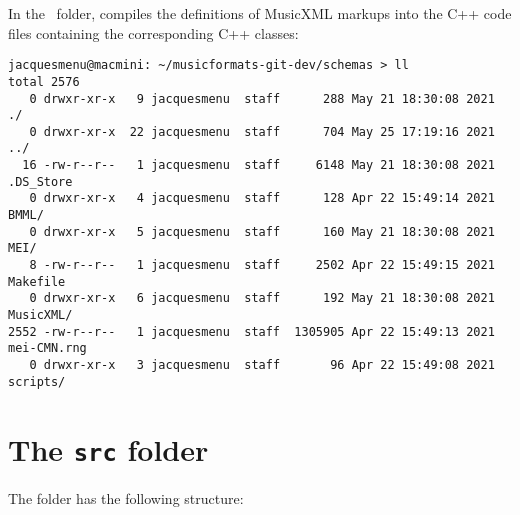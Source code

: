 In the \lxmlTemplates\ folder,  compiles the definitions of MusicXML markups into the C++ code files containing the corresponding C++ classes:
\begin{lstlisting}[language=Terminal]
jacquesmenu@macmini: ~/musicformats-git-dev/schemas > ll
total 2576
   0 drwxr-xr-x   9 jacquesmenu  staff      288 May 21 18:30:08 2021 ./
   0 drwxr-xr-x  22 jacquesmenu  staff      704 May 25 17:19:16 2021 ../
  16 -rw-r--r--   1 jacquesmenu  staff     6148 May 21 18:30:08 2021 .DS_Store
   0 drwxr-xr-x   4 jacquesmenu  staff      128 Apr 22 15:49:14 2021 BMML/
   0 drwxr-xr-x   5 jacquesmenu  staff      160 May 21 18:30:08 2021 MEI/
   8 -rw-r--r--   1 jacquesmenu  staff     2502 Apr 22 15:49:15 2021 Makefile
   0 drwxr-xr-x   6 jacquesmenu  staff      192 May 21 18:30:08 2021 MusicXML/
2552 -rw-r--r--   1 jacquesmenu  staff  1305905 Apr 22 15:49:13 2021 mei-CMN.rng
   0 drwxr-xr-x   3 jacquesmenu  staff       96 Apr 22 15:49:08 2021 scripts/
\end{lstlisting}


\section{The {\tt src} folder}

The  folder has the following structure:%

